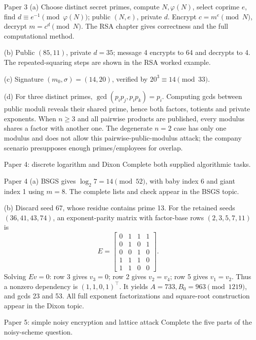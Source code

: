\documentclass[11pt,a4paper]{article}
\begin{document}
\begin{answer}{Paper 3}
(a) Choose distinct secret primes, compute \(N,\varphi(N)\), select coprime \(e\), find \(d\equiv e^{-1}\pmod{\varphi(N)}\); public \((N,e)\), private \(d\). Encrypt \(c=m^e\pmod N\), decrypt \(m=c^d\pmod N\). The RSA chapter gives correctness and the full computational method.

(b) Public \((85,11)\), private \(d=35\); message 4 encrypts to 64 and decrypts to 4. The repeated-squaring steps are shown in the RSA worked example.

(c) Signature \((m_0,\sigma)=(14,20)\), verified by \(20^3\equiv14\pmod{33}\).

(d) For three distinct primes, \(\gcd(p_ip_j,p_ip_k)=p_i\). Computing gcds between public moduli reveals their shared prime, hence both factors, totients and private exponents. When \(n\ge3\) and all pairwise products are published, every modulus shares a factor with another one. The degenerate \(n=2\) case has only one modulus and does not allow this pairwise-public-modulus attack; the company scenario presupposes enough primes/employees for overlap.
\end{answer}
\begin{question}{Paper 4: discrete logarithm and Dixon}
Complete both supplied algorithmic tasks.
\end{question}
\begin{answer}{Paper 4}
(a) BSGS gives \(\log_2 7=14\pmod{52}\), with baby index 6 and giant index 1 using \(m=8\). The complete lists and check appear in the BSGS topic.

(b) Discard seed 67, whose residue contains prime 13. For the retained seeds \((36,41,43,74)\), an exponent-parity matrix with factor-base rows \((2,3,5,7,11)\) is
\[E=\begin{bmatrix}0&1&1&1\\0&1&0&1\\0&0&1&0\\1&1&1&0\\1&1&0&0\end{bmatrix}.\]
Solving \(Ev=0\): row 3 gives \(v_3=0\); row 2 gives \(v_2=v_4\); row 5 gives \(v_1=v_2\). Thus a nonzero dependency is \((1,1,0,1)^\top\). It yields \(A=733,B_0=963\pmod{1219}\), and gcds 23 and 53. All full exponent factorizations and square-root construction appear in the Dixon topic.
\end{answer}
\begin{question}{Paper 5: simple noisy encryption and lattice attack}
Complete the five parts of the noisy-scheme question.
\end{question}
\end{document}
